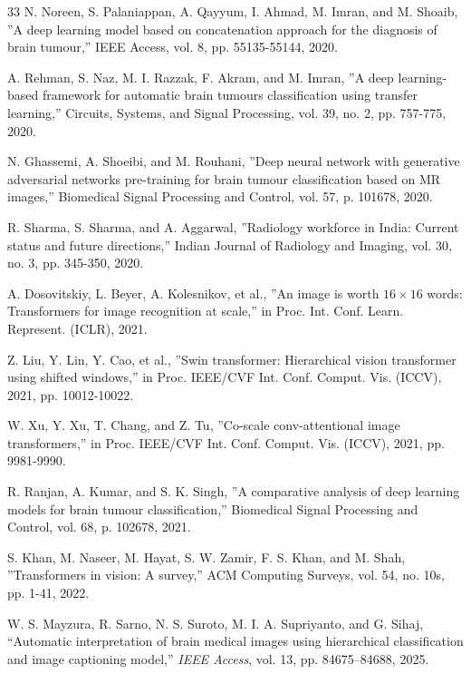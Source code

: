 \documentclass[final,3p,times,number]{elsarticle}
\begin{document}
\begin{thebibliography}{33}
 N. Noreen, S. Palaniappan, A. Qayyum, I. Ahmad, M. Imran, and M. Shoaib, ''A deep learning model based on concatenation approach for the diagnosis of brain tumour,'' IEEE Access, vol. 8, pp. 55135-55144, 2020.

 A. Rehman, S. Naz, M. I. Razzak, F. Akram, and M. Imran, ''A deep learning-based framework for automatic brain tumours classification using transfer learning,'' Circuits, Systems, and Signal Processing, vol. 39, no. 2, pp. 757-775, 2020.

 N. Ghassemi, A. Shoeibi, and M. Rouhani, ''Deep neural network with generative adversarial networks pre-training for brain tumour classification based on MR images,'' Biomedical Signal Processing and Control, vol. 57, p. 101678, 2020.

 R. Sharma, S. Sharma, and A. Aggarwal, ''Radiology workforce in India: Current status and future directions,'' Indian Journal of Radiology and Imaging, vol. 30, no. 3, pp. 345-350, 2020.

 A. Dosovitskiy, L. Beyer, A. Kolesnikov, et al., ''An image is worth $16\times 16$ words: Transformers for image recognition at scale,'' in Proc. Int. Conf. Learn. Represent. (ICLR), 2021.

 Z. Liu, Y. Lin, Y. Cao, et al., ''Swin transformer: Hierarchical vision transformer using shifted windows,'' in Proc. IEEE/CVF Int. Conf. Comput. Vis. (ICCV), 2021, pp. 10012-10022.

 W. Xu, Y. Xu, T. Chang, and Z. Tu, ''Co-scale conv-attentional image transformers,'' in Proc. IEEE/CVF Int. Conf. Comput. Vis. (ICCV), 2021, pp. 9981-9990.

 R. Ranjan, A. Kumar, and S. K. Singh, ''A comparative analysis of deep learning models for brain tumour classification,'' Biomedical Signal Processing and Control, vol. 68, p. 102678, 2021.

 S. Khan, M. Naseer, M. Hayat, S. W. Zamir, F. S. Khan, and M. Shah, ''Transformers in vision: A survey,'' ACM Computing Surveys, vol. 54, no. 10s, pp. 1-41, 2022.

 W. S. Mayzura, R. Sarno, N. S. Suroto, M. I. A. Supriyanto, and G. Sihaj, ``Automatic interpretation of brain medical images using hierarchical classification and image captioning model,'' \emph{IEEE Access}, vol. 13, pp. 84675--84688, 2025.

\end{thebibliography}
\end{document}
